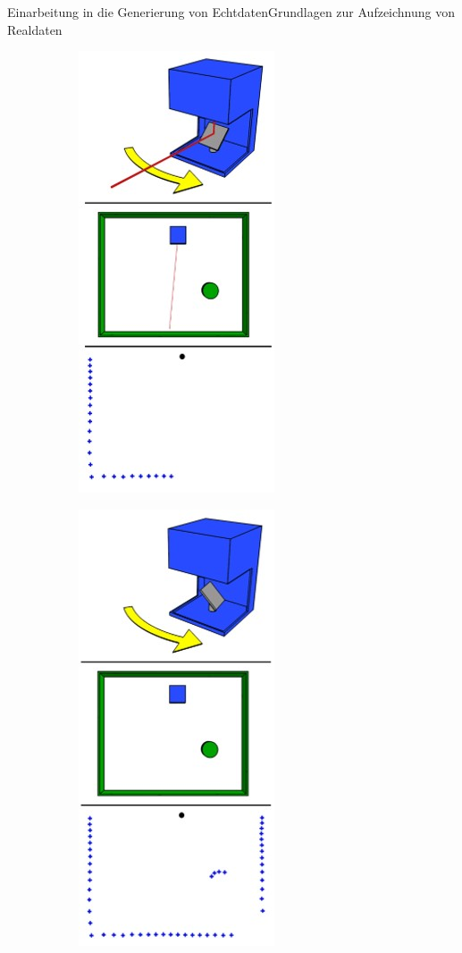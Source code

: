 \documentclass[169, handout	]{THIbeamer} %
\begin{document}
\begin{frame}{Einarbeitung in die Generierung von Echtdaten}{Grundlagen zur Aufzeichnung von Realdaten}
\begin{figure}[htbp]
\begin{subfigure}[b]{0.15\textwidth}
       		 	\includegraphics[scale=0.21]{required/LiDAR-Sensor2.jpg}
        		\label{Lidar-t2}
    		\end{subfigure}
   	 		\begin{subfigure}[b]{0.15\textwidth}
        		\includegraphics[scale=0.21]{required/LiDAR-Sensor3.jpg}
        		\label{Lidar-t3}
    		\end{subfigure}
    		\label{Lidar in Raum}
		\end{figure}
	\end{frame}
	
\end{document}
